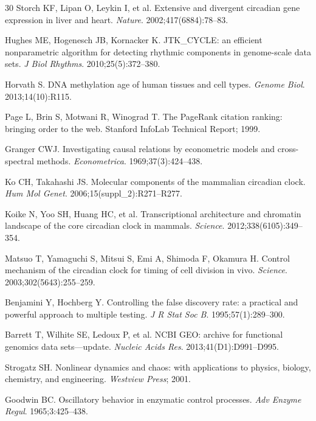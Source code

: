 \documentclass[11pt,letterpaper]{article}
\begin{document}
\begin{thebibliography}{30}
Storch KF, Lipan O, Leykin I, et al.
Extensive and divergent circadian gene expression in liver and heart.
\textit{Nature}. 2002;417(6884):78--83.

Hughes ME, Hogenesch JB, Kornacker K.
JTK\_CYCLE: an efficient nonparametric algorithm for detecting rhythmic components in genome-scale data sets.
\textit{J Biol Rhythms}. 2010;25(5):372--380.

Horvath S.
DNA methylation age of human tissues and cell types.
\textit{Genome Biol}. 2013;14(10):R115.

Page L, Brin S, Motwani R, Winograd T.
The PageRank citation ranking: bringing order to the web.
Stanford InfoLab Technical Report; 1999.

Granger CWJ.
Investigating causal relations by econometric models and cross-spectral methods.
\textit{Econometrica}. 1969;37(3):424--438.

Ko CH, Takahashi JS.
Molecular components of the mammalian circadian clock.
\textit{Hum Mol Genet}. 2006;15(suppl\_2):R271--R277.

Koike N, Yoo SH, Huang HC, et al.
Transcriptional architecture and chromatin landscape of the core circadian clock in mammals.
\textit{Science}. 2012;338(6105):349--354.

Matsuo T, Yamaguchi S, Mitsui S, Emi A, Shimoda F, Okamura H.
Control mechanism of the circadian clock for timing of cell division in vivo.
\textit{Science}. 2003;302(5643):255--259.

Benjamini Y, Hochberg Y.
Controlling the false discovery rate: a practical and powerful approach to multiple testing.
\textit{J R Stat Soc B}. 1995;57(1):289--300.

Barrett T, Wilhite SE, Ledoux P, et al.
NCBI GEO: archive for functional genomics data sets---update.
\textit{Nucleic Acids Res}. 2013;41(D1):D991--D995.

Strogatz SH.
Nonlinear dynamics and chaos: with applications to physics, biology, chemistry, and engineering.
\textit{Westview Press}; 2001.

Goodwin BC.
Oscillatory behavior in enzymatic control processes.
\textit{Adv Enzyme Regul}. 1965;3:425--438.


\end{thebibliography}
\end{document}
